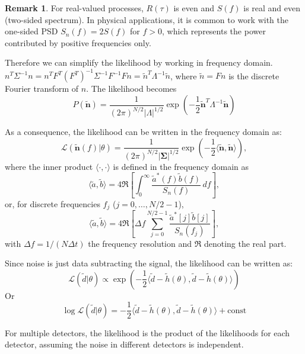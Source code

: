\documentclass[12pt, a4paper]{article}
\newcounter{lecture}              %
\theoremstyle{plain} %
\theoremstyle{definition} %
\newtheorem{remark}{Remark}[lecture]
\begin{document}
    \begin{remark}
    For real-valued processes, $R(\tau)$ is even and $S(f)$ is real and even (two-sided spectrum). In physical applications, it is common to work with the one-sided PSD $S_n(f) = 2S(f)$ for $f > 0$, which represents the power contributed by positive frequencies only.
    \end{remark}

Therefore we can simplify the likelihood by working in frequency domain. $n^T \Sigma^{-1} n = n^T F^T (F^T)^{-1} \Sigma^{-1} F^{-1} F n = \tilde{n}^T \Lambda^{-1} \tilde{n}$, where $\tilde{n} = F n$ is the discrete Fourier transform of $n$. The likelihood becomes
    \begin{equation}
        P(\tilde{\mathbf{n}}) = \frac{1}{(2\pi)^{N/2} |\Lambda|^{1/2}} \exp\left(-\frac{1}{2} \tilde{\mathbf{n}}^T \Lambda^{-1} \tilde{\mathbf{n}}\right)
    \end{equation}


As a consequence, the likelihood can be written in the frequency domain as:
\[
\mathcal{L}(\tilde{\mathbf{n}}(f)|\theta) = \frac{1}{(2\pi)^{N/2} |\boldsymbol{\Sigma}|^{1/2}} 
\exp\left( -\frac{1}{2} \langle \tilde{\mathbf{n}}, \tilde{\mathbf{n}} \rangle \right),
\]
where the inner product $\langle \cdot, \cdot \rangle$ is defined in the frequency domain as
\[
\langle \tilde{a}, \tilde{b} \rangle = 4 \Re \left[ \int_{0}^{\infty} \frac{\tilde{a}^*(f) \tilde{b}(f)}{S_n(f)} \, df \right],
\]
or, for discrete frequencies $f_j$ ($j = 0, \dots, N/2-1$),
\[
\langle \tilde{a}, \tilde{b} \rangle = 4 \Re \left[ \Delta f \sum_{j=0}^{N/2-1} \frac{\tilde{a}^*[j] \tilde{b}[j]}{S_n(f_j)} \right],
\]
with $\Delta f = 1/(N \Delta t)$ the frequency resolution and $\Re$ denoting the real part.

Since noise is just data subtracting the signal, the likelihood can be written as:
\begin{equation}
    \mathcal{L}(\tilde d|\theta) \propto \exp\left(-\frac{1}{2} \langle \tilde d - \tilde h(\theta), \tilde d - \tilde h(\theta) \rangle\right)
\end{equation}
Or 
\begin{equation}
    \log \mathcal{L}(\tilde d|\theta) = -\frac{1}{2} \langle \tilde d - \tilde h(\theta), \tilde d - \tilde h(\theta) \rangle + \text{const}
\end{equation}

For multiple detectors, the likelihood is the product of the likelihoods for each detector, assuming the noise in different detectors is independent.
\end{document}
